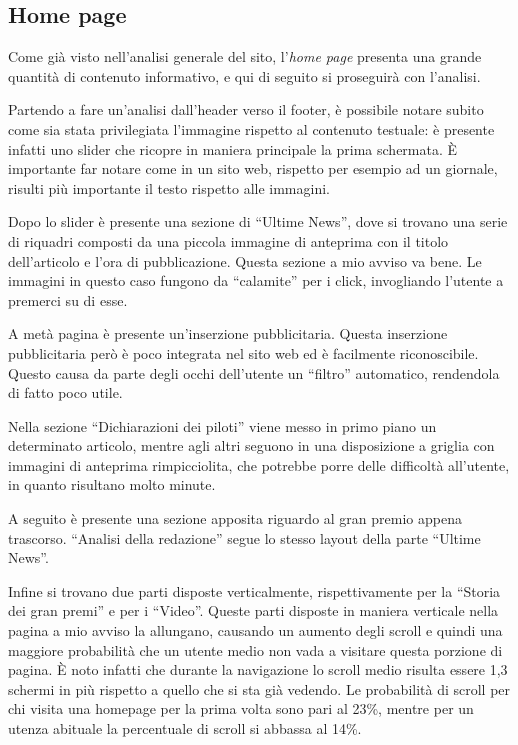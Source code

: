 \subsection{Home page}
Come già visto nell'analisi generale del sito, l'\textit{home page} presenta
una grande quantità di contenuto informativo, e qui di seguito si proseguirà con
l'analisi.

Partendo a fare un'analisi dall'header verso il footer, è possibile notare
subito come sia stata privilegiata l'immagine rispetto al contenuto testuale:
è presente infatti uno slider che ricopre in maniera principale la prima
schermata. È importante far notare come in un sito web, rispetto
per esempio ad un giornale, risulti più importante il testo rispetto alle
immagini.

Dopo lo slider è presente una sezione di ``Ultime News'', dove si trovano
una serie di riquadri composti da una piccola immagine di anteprima con il
titolo dell'articolo e l'ora di pubblicazione. Questa sezione a mio avviso va
bene. Le immagini in questo caso fungono da ``calamite'' per i click,
invogliando l'utente a premerci su di esse.

A metà pagina è presente un'inserzione pubblicitaria. Questa inserzione
pubblicitaria però è poco integrata nel sito web ed è facilmente riconoscibile.
Questo causa da parte degli occhi dell'utente un ``filtro'' automatico,
rendendola di fatto poco utile.

Nella sezione ``Dichiarazioni dei piloti'' viene messo in primo piano un
determinato articolo, mentre agli altri seguono in una disposizione a griglia
con immagini di anteprima rimpicciolita, che potrebbe porre delle difficoltà
all'utente, in quanto risultano molto minute.

A seguito è presente una sezione apposita riguardo al gran premio appena
trascorso. ``Analisi della redazione'' segue lo stesso layout della parte
``Ultime News''.

Infine si trovano due parti disposte verticalmente, rispettivamente per la
``Storia dei gran premi'' e per i ``Video''. Queste parti disposte in maniera
verticale nella pagina a mio avviso la allungano, causando un aumento degli
scroll e quindi una maggiore probabilità che un utente medio non vada a visitare
questa porzione di pagina. È noto infatti che durante la navigazione lo scroll
medio risulta essere 1,3 schermi in più rispetto a quello che si sta già
vedendo. Le probabilità di scroll per chi visita una homepage per la prima
volta sono pari al 23\%, mentre per un utenza abituale la percentuale di scroll
si abbassa al 14\%.

